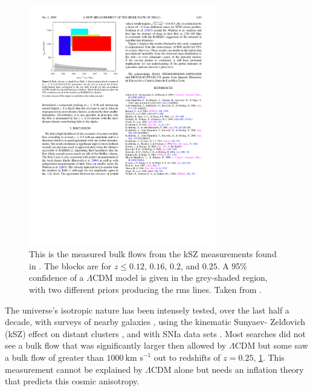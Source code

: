 \documentclass[apj, iop]{emulateapj}
\newcommand{\sn}{SNIa}
\newcommand{\lcdm}{$\Lambda$CDM}     %
\newcommand{\kms}{\ensuremath{~\text{km s}^{-1}}}
\begin{document}
\begin{figure}
	\includegraphics[width=3.2in]{Kashlinsky2010.pdf} 
    \caption{This is the measured bulk flows from the kSZ measurements found in 
    \cite{Kashlinsky10}. The blocks are for $z \leq 0.12$, $0.16$, $0.2$, and 
    $0.25$. A 95\% confidence of a \lcdm{} model is given in the grey-shaded 
    region, with two different priors producing the rms lines.
    Taken from \cite{Kashlinsky10}.}
	\label{f:ksz} 
\end{figure}

The universe's isotropic nature has been intensely tested, over the last half a
decade, with surveys of nearby galaxies \citep{Ma13,Wiltshire:2013dl}, using
the kinematic Sunyaev- Zel\'{d}ovich (kSZ) effect on distant clusters
\citep{Kashlinsky10,Planckdf}, and with \sn{} data sets \citep[and
others]{Dai11,Feindt13,Rathaus13}. Most searches did not see a bulk flow that
was significantly larger then allowed by \lcdm{} but some saw a bulk flow of
greater than $1000 \kms{}$ out to redshifts of $z = 0.25$, \cref{f:ksz}. This
measurement cannot be explained by $\Lambda$CDM alone but needs an inflation
theory that predicts this cosmic anisotropy.
\end{document}
